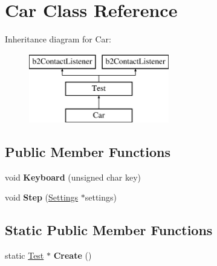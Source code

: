 \hypertarget{class_car}{\section{Car Class Reference}
\label{class_car}
}
Inheritance diagram for Car\-:\begin{figure}[H]
\begin{center}
\leavevmode
\includegraphics[height=3.000000cm]{class_car}
\end{center}
\end{figure}
\subsection*{Public Member Functions}
\begin{DoxyCompactItemize}
\item 
\hypertarget{class_car_a4833284c35cbc1bb1ca6db3551cd72c3}{void {\bfseries Keyboard} (unsigned char key)}\label{class_car_a4833284c35cbc1bb1ca6db3551cd72c3}

\item 
\hypertarget{class_car_a668756cd562be56ca37f2eb8e7c4a67d}{void {\bfseries Step} (\hyperlink{struct_settings}{Settings} $\ast$settings)}\label{class_car_a668756cd562be56ca37f2eb8e7c4a67d}

\end{DoxyCompactItemize}
\subsection*{Static Public Member Functions}
\begin{DoxyCompactItemize}
\item 
\hypertarget{class_car_abfe772485555cc11af1df2cb468e402c}{static \hyperlink{class_test}{Test} $\ast$ {\bfseries Create} ()}\label{class_car_abfe772485555cc11af1df2cb468e402c}

\end{DoxyCompactItemize}
